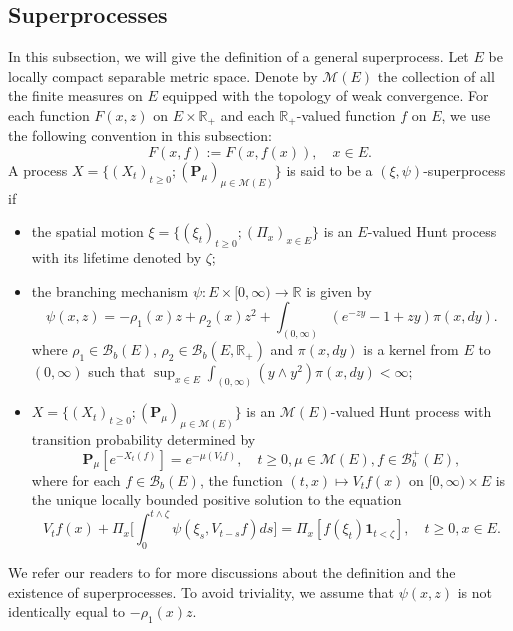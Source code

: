 \documentclass[12pt,a4paper]{amsart}
\theoremstyle{plain}
\theoremstyle{definition}
\numberwithin{equation}{section}
\begin{document}
\subsection{Superprocesses}
\label{sec: definition of superprocess}
    In this subsection, we will give the definition of a general superprocess.
    Let $E$ be locally compact separable metric space. Denote by $\mathcal M(E)$ the collection of all the finite measures on $E$ equipped with the topology of weak convergence.
    For each function $F(x,z)$ on $E\times \mathbb R_+$ and each $\mathbb R_+$-valued function $f$ on $E$, we use the following convention in this subsection:
\[
    F(x,f):= F(x,f(x)),\quad x\in E.
\]
    A process $X=\{(X_t)_{t\geq 0}; (\mathbf P_\mu)_{\mu \in \mathcal M(E)}\}$ is said to be a $(\xi,\psi)$-superprocess if
\begin{itemize}
\item
    the spatial motion $\xi=\{(\xi_t)_{t\geq 0};(\Pi_x)_{x\in E}\}$ is an $E$-valued Hunt process with its lifetime denoted by $\zeta$;
\item
    the branching mechanism $\psi: E\times[0,\infty) \to \mathbb R$ is given by
\begin{equation}
\label{eq: branching mechanism}
    \psi(x,z)=
    -\rho_1(x) z + \rho_2 (x) z^2 + \int_{(0,\infty)} (e^{-zy} - 1 + zy) \pi(x,dy).
\end{equation}
    where $\rho_1 \in \mathcal B_b(E)$, $\rho_2 \in \mathcal B_b(E, \mathbb R_+)$ and $\pi(x,dy)$ is a kernel from $E$ to $(0,\infty)$ such that $\sup_{x\in E} \int_{(0,\infty)} (y\wedge y^2) \pi(x,dy) < \infty$;
\item
    $X=\{(X_t)_{t\geq 0}; (\mathbf P_\mu)_{\mu \in \mathcal M(E)}\}$ is an $\mathcal M(E)$-valued Hunt process with transition probability determined by
\begin{equation}
    \mathbf P_\mu [e^{-X_t(f)}] = e^{-\mu(V_tf)},
    \quad t\geq 0, \mu \in \mathcal M(E), f\in \mathcal B^+_b(E),
\end{equation}
    where for each $f\in \mathcal B_b(E)$, the function $(t,x)\mapsto V_tf(x)$ on $[0,\infty) \times E$ is the unique locally bounded positive solution to the equation
\begin{equation}\label{eq:FKPP_in_definition}
    V_tf(x) + \Pi_x \Big[  \int_0^{t\wedge \zeta} \psi(\xi_s,V_{t-s}f)ds \Big]
    = \Pi_x [ f(\xi_t)\mathbf 1_{t<\zeta} ],
    \quad t \geq 0, x \in E.
\end{equation}
\end{itemize}
    We refer our readers to \cite{Li2011Measure-valued} for more discussions about the definition and the existence of superprocesses.
    To avoid triviality, we assume that
    $\psi(x,z)$ is not identically equal to $-\rho_1(x)z$.
\end{document}
